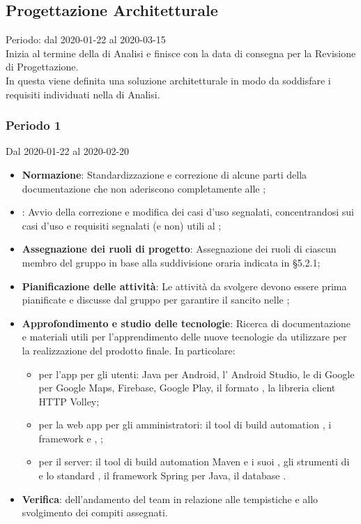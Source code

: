 \subsection{Progettazione Architetturale}
Periodo: dal 2020-01-22 al 2020-03-15\\
Inizia al termine della  di Analisi e finisce con la data di consegna per la Revisione di Progettazione.\\
In questa  viene definita una soluzione architetturale in modo da soddisfare i requisiti individuati nella  di Analisi.

\subsubsection{Periodo 1} 
Dal 2020-01-22 al 2020-02-20
\begin{itemize}
	\item \textbf{Normazione}: Standardizzazione e correzione di alcune parti della documentazione che non aderiscono completamente alle \NdP{};
	\item \textbf{\AdR{}}: Avvio della correzione e modifica dei casi d'uso segnalati, concentrandosi sui casi d'uso e requisiti segnalati (e non) utili al ;
	\item \textbf{Assegnazione dei ruoli di progetto}: Assegnazione dei ruoli di ciascun membro del gruppo in base alla suddivisione oraria indicata in §5.2.1;
	\item \textbf{Pianificazione delle attività}: Le attività da svolgere devono essere prima pianificate e discusse dal gruppo per garantire il  sancito nelle \NdP{};
	\item \textbf{Approfondimento e studio delle tecnologie}: Ricerca di documentazione e materiali utili per l'apprendimento delle nuove tecnologie da utilizzare per la realizzazione del prodotto finale.
	In particolare:
	\begin{itemize}
		\item per l'app per gli utenti: Java per Android, l' Android Studio, le  di Google per Google Maps, Firebase, Google Play, il formato , la libreria client HTTP Volley;
		\item per la web app per gli amministratori: il tool di build automation , i framework  e , ;
		\item per il server: il tool di build automation Maven e i suoi , gli strumenti di  e lo standard , il framework Spring per Java, il database .
	\end{itemize}
	\item \textbf{Verifica}:  dell'andamento del team in relazione alle tempistiche e allo svolgimento dei compiti assegnati.
\end{itemize}

